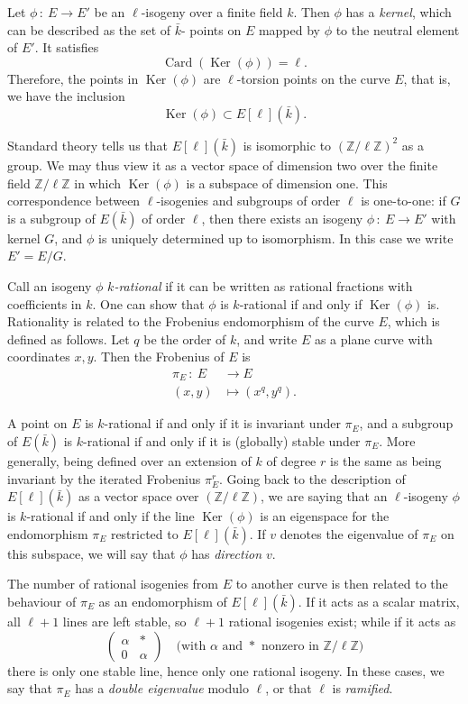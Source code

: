 \documentclass{article}
\newcommand{\Z}{\mathbb{Z}}
\newcommand{\from}{\ensuremath{\,:\ }}
\theoremstyle{definition}
\DeclareMathOperator{\Ker}{Ker}
\DeclareMathOperator{\Card}{Card}
\begin{document}
Let $\phi\from E\to E'$ be an $\ell$-isogeny over a finite field $k$. Then 
$\phi$ has a \emph{kernel}, which can be described as the set of $\bar{k}$-
points on $E$ mapped by $\phi$ to the neutral element of $E'$. It satisfies
\[
\Card(\Ker(\phi)) = \ell.
\]
Therefore, the points in $\Ker(\phi)$ are $\ell$-torsion points on the curve 
$E$, that is, we have the inclusion
\[
\Ker(\phi) \subset E[\ell](\bar{k}).
\]

Standard theory tells us that $E[\ell](\bar{k})$ is isomorphic to $(\Z/\ell\Z)^2$
as a group. We may thus view it as a vector space of dimension two over the 
finite field $\Z/\ell\Z$ in which $\Ker(\phi)$ is a subspace of dimension one. 
This correspondence between $\ell$-isogenies and subgroups of order $\ell$ is 
one-to-one: if $G$ is a subgroup of $E(\bar{k})$ of order $\ell$, then there 
exists an isogeny $\phi\from E\to E'$ with kernel $G$, and $\phi$ is uniquely 
determined up to isomorphism. In this case we write $E' = E/G$.

Call an isogeny $\phi$ \emph{$k$-rational} if it can be written as rational 
fractions with coefficients in $k$. One can show that $\phi$ is $k$-rational if 
and only if $\Ker(\phi)$ is.
Rationality is related to the Frobenius endomorphism of the curve $E$, which is 
defined as follows. Let $q$ be the order of $k$, and write $E$ as a plane curve 
with coordinates $x, y$. Then the Frobenius of $E$ is
\[
\begin{aligned}
\pi_E \from E &\to E \\
 (x, y) &\mapsto (x^q, y^q).
\end{aligned}
\]

A point on $E$ is $k$-rational if and only if it is invariant under $\pi_E$, 
and a subgroup of $E(\bar{k})$ is $k$-rational if and only if it is (globally) 
stable under $\pi_E$. More generally, being defined over an extension of $k$
of degree $r$ is the same as being invariant by the iterated Frobenius $\pi_E^r$.
Going back to the description of $E[\ell](\bar{k})$ as a 
vector space over $(\Z/\ell\Z)$, we are saying that an $\ell$-isogeny $\phi$ is 
$k$-rational if and only if the line $\Ker(\phi)$ is an eigenspace for the 
endomorphism $\pi_E$ restricted to $E[\ell](\bar{k})$. If $v$ denotes the 
eigenvalue of $\pi_E$ on this subspace, we will say that $\phi$ has \emph{
direction $v$}.


The number of rational isogenies from $E$ to another curve is then related to 
the behaviour of $\pi_E$ as an endomorphism of $E[\ell](\bar{k})$. If it acts 
as a scalar matrix, all $\ell+1$ lines are left stable, so $\ell+1$ rational 
isogenies exist; while if it acts as
\[
\left(
\begin{matrix}
\alpha & * \\
0 & \alpha
\end{matrix}
\right)
\quad
\text{(with $\alpha$ and $*$ nonzero in $\Z/\ell\Z$)}
\]
there is only one stable line, hence only one rational isogeny. In these cases, 
we say that $\pi_E$ has a \emph{double eigenvalue} modulo $\ell$, or that $\ell$
 is \emph{ramified}.
\end{document}
